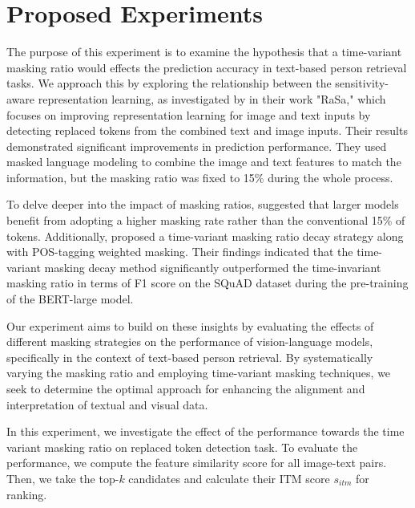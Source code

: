 \chapter{Proposed Experiments}
The purpose of this experiment is to examine the hypothesis that a time-variant masking ratio would effects the prediction accuracy in text-based person retrieval tasks. We approach this by exploring the relationship between the sensitivity-aware representation learning, as investigated by \cite{Bai2023RaSaRA} in their work "RaSa," which focuses on improving representation learning for image and text inputs by detecting replaced tokens from the combined text and image inputs. Their results demonstrated significant improvements in prediction performance. They used masked language modeling to combine the image and text features to match the information, but the masking ratio was fixed to 15\% during the whole process.

To delve deeper into the impact of masking ratios, \cite{wettig-etal-2023-mask} suggested that larger models benefit from adopting a higher masking rate rather than the  conventional 15\% of tokens. Additionally, \cite{yang2023learningbettermaskingbetter} proposed a time-variant masking ratio decay strategy along with POS-tagging weighted masking. Their findings indicated that the time-variant masking decay method significantly outperformed the time-invariant masking ratio in terms of F1 score on the SQuAD dataset during the pre-training of the BERT-large model.

Our experiment aims to build on these insights by evaluating the effects of different masking strategies on the performance of vision-language models, specifically in the context of text-based person retrieval. By systematically varying the masking ratio and employing time-variant masking techniques, we seek to determine the optimal approach for enhancing the alignment and interpretation of textual and visual data.

In this experiment, we investigate the effect of the performance towards the time variant masking ratio on replaced token detection task. To evaluate the performance, we compute the feature similarity score for all image-text pairs. Then, we take the top-$k$ candidates and calculate their ITM score $s_{itm}$ for ranking. 

